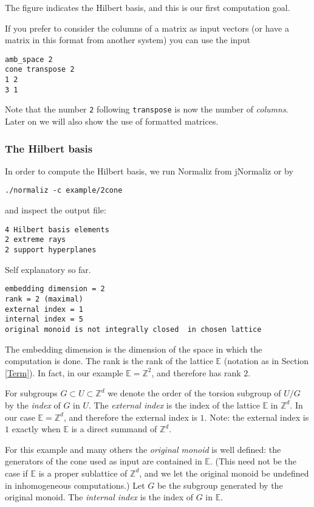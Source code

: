 \documentclass[12pt,a4paper]{scrartcl}
\theoremstyle{definition}
\def\ZZ{{\mathbb Z}}
\def\EE{{\mathbb E}}
\begin{document}
The figure indicates the Hilbert basis, and this is our first computation goal.

If you prefer to consider the columns of a matrix as input vectors (or have a matrix in this format from another system) you can use the input
\begin{Verbatim}
amb_space 2
cone transpose 2
1 2
3 1
\end{Verbatim}
Note that the number \verb|2| following \verb|transpose| is now the number of \emph{columns}. Later on we will also show the use of formatted matrices.

\subsubsection{The Hilbert basis}
In order to compute the Hilbert basis, we run Normaliz from jNormaliz or by
\begin{Verbatim}
./normaliz -c example/2cone	
\end{Verbatim}
and inspect the output file:
\begin{Verbatim}
4 Hilbert basis elements
2 extreme rays
2 support hyperplanes
\end{Verbatim}
Self explanatory so far.
\begin{Verbatim}
embedding dimension = 2
rank = 2 (maximal)
external index = 1
internal index = 5
original monoid is not integrally closed  in chosen lattice
\end{Verbatim}
The embedding dimension is the dimension of the space in which the computation is done. The rank is the rank of the lattice $\EE$ (notation as in Section \ref{Term}). In fact, in our example $\EE=\ZZ^2$, and therefore has rank $2$.

For subgroups $G\subset U\subset \ZZ^d$ we denote the order of the torsion subgroup of $U/G$ by the \emph{index} of $G$ in $U$. The \emph{external index} is the index of the lattice $\EE$ in $\ZZ^d$. In our case $\EE=\ZZ^d$, and therefore the external index is $1$. Note: the external index is $1$ exactly when $\EE$ is a direct summand of $\ZZ^d$.

For this example and many others the \emph{original monoid} is well defined: the generators of the cone used as input are contained in $\EE$. (This need not be the case if $\EE$ is a proper sublattice of $\ZZ^d$, and we let the original monoid be undefined in inhomogeneous computations.) Let $G$ be the subgroup generated by the original monoid. The \emph{internal index} is the index of $G$ in $\EE$.
\end{document}
